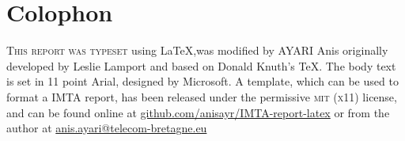 \chapter*{Colophon}

\begin{center}
\parbox{200pt}{\raggedright\lettrine[lines=3,slope=-2pt,nindent=-4pt]{\textcolor{IMTA-Blue}{T}}{his report was typeset} using \LaTeX,was modified by AYARI Anis originally developed by Leslie Lamport and based on Donald Knuth's \TeX. The body text is set in 11 point Arial, designed by Microsoft. A template, which can be used to format a IMTA report, has been released under the permissive \textsc{mit} (\textsc{x}11) license, and can be found online at \href{https://github.com/anisayr/IMTA-report-latex}{github.com/anisayr/IMTA-report-latex} or from the author at \href{mailto:anis.ayari@telecom-bretagne.eu}{anis.ayari@telecom-bretagne.eu}
}
\end{center}